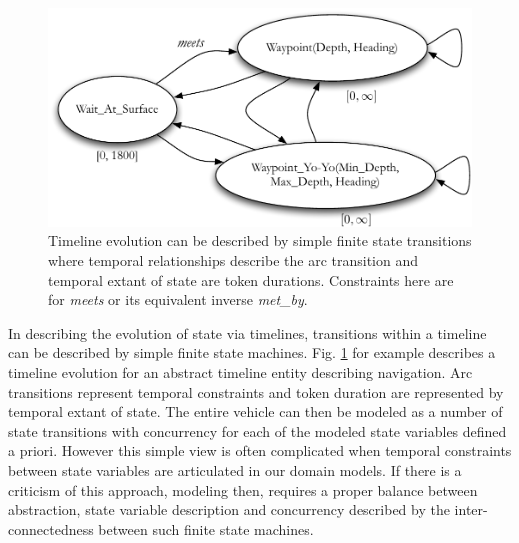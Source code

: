\begin{figure}
\centering
\includegraphics[scale=0.3]{figs/FSM-transition.pdf}
\caption{\small Timeline evolution can be described by simple finite
  state transitions where temporal relationships describe the arc
  transition and temporal extant of state are token
  durations. Constraints here are for \emph{meets} or its equivalent
  inverse \emph{met\_by}.}
\label{fig:FSM}
\vskip-0.3cm
\end{figure}

In describing the evolution of state via timelines, transitions within
a timeline can be described by simple finite state
machines. Fig. \ref{fig:FSM} for example describes a timeline
evolution for an abstract timeline entity describing navigation. Arc
transitions represent temporal constraints and token duration are
represented by temporal extant of state. The entire vehicle can then
be modeled as a number of state transitions with concurrency for each
of the modeled state variables defined a priori. However this simple
view is often complicated when temporal constraints between state
variables are articulated in our domain models. If there is a
criticism of this approach, modeling then, requires a proper balance
between abstraction, state variable description and concurrency
described by the inter-connectedness between such finite state
machines.


